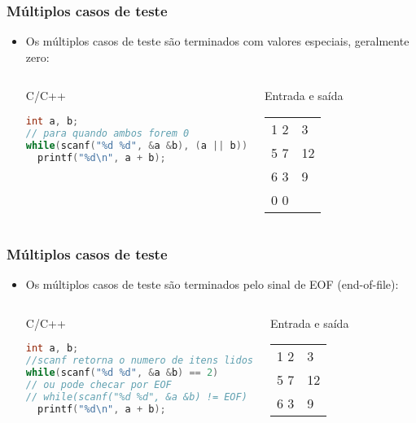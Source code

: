 \begin{frame} [fragile]
  \frametitle{Múltiplos casos de teste}
    \begin{itemize}
      \item {\small Os múltiplos casos de teste são terminados com valores especiais, geralmente zero:}
      \begin{columns}
      \begin{block:ie}{C/C++}
	\begin{lstlisting}[language=c]
int a, b;
// para quando ambos forem 0
while(scanf("%d %d", &a &b), (a || b))
  printf("%d\n", a + b);
	\end{lstlisting}
      \end{block:ie}

      \begin{block:ie}{Entrada e saída}
	\begin{tabularx}{\textwidth}{|X|X|}
	  1 2&3\\5 7&12\\6 3&9\\0 0&
	\end{tabularx}
      \end{block:ie}
    \end{columns}
  \end{itemize}
\end{frame}

\begin{frame} [fragile]
  \frametitle{Múltiplos casos de teste}
    \begin{itemize}
      \item {\small Os múltiplos casos de teste são terminados pelo sinal de EOF (end-of-file):}
      \begin{columns}
      \begin{block:ie}{C/C++}
	\begin{lstlisting}[language=c]
int a, b;
//scanf retorna o numero de itens lidos
while(scanf("%d %d", &a &b) == 2)
// ou pode checar por EOF
// while(scanf("%d %d", &a &b) != EOF)
  printf("%d\n", a + b);
	\end{lstlisting}
      \end{block:ie}

      \begin{block:ie}{Entrada e saída}
	\begin{tabularx}{\textwidth}{|X|X|}
	  1 2&3\\5 7&12\\6 3&9
	\end{tabularx}
      \end{block:ie}
    \end{columns}
  \end{itemize}
\end{frame}

